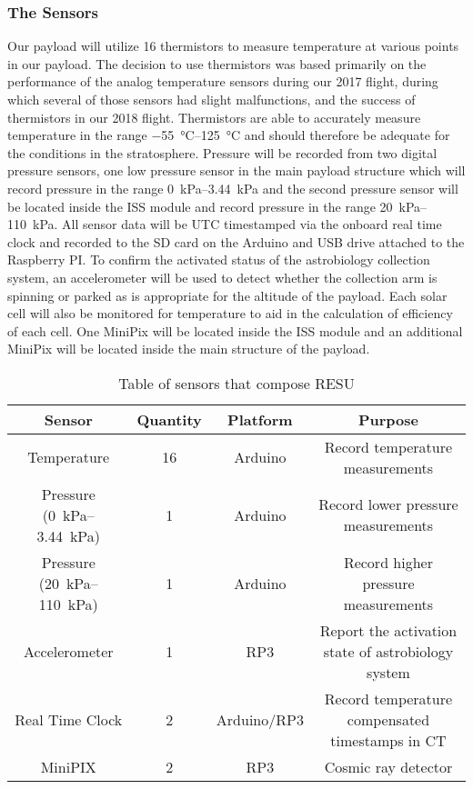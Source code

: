 \subsubsection{The Sensors}

Our payload will utilize 16 thermistors to measure temperature at various points in our payload. The decision to use thermistors was based primarily on the performance of the analog temperature sensors during our 2017 flight, during which several of those sensors had slight malfunctions, and the success of thermistors in our 2018 flight. Thermistors are able to accurately measure temperature in the range \SIrange{-55}{125}{\celsius} and should therefore be adequate for the conditions in the stratosphere. Pressure will be recorded from two digital pressure sensors, one low pressure sensor in the main payload structure which will record pressure in the range \SIrange{0}{3.44}{\kilo\pascal} and the second pressure sensor will be located inside the ISS module and record pressure in the range \SIrange{20}{110}{\kilo\pascal}. All sensor data will be UTC timestamped via the onboard real time clock and recorded to the SD card on the Arduino and USB drive attached to the Raspberry PI. To confirm the activated status of the astrobiology collection system, an accelerometer will be used to detect whether the collection arm is spinning or parked as is appropriate for the altitude of the payload. Each solar cell will also be monitored for temperature to aid in the calculation of efficiency of each cell. One MiniPix will be located inside the ISS module and an additional MiniPix will be located inside the main structure of the payload.

\begin{table}[h!]
\centering
\caption{Table of sensors that compose RESU}
\label{tab:Sensors}
\bigskip
\begin{tabular}{|c|c|c|c|}
\hline
\multicolumn{1}{|c|}{\bfseries Sensor} & {\bfseries Quantity} & {\bfseries Platform} & {\bfseries Purpose} \\
\hline
    Temperature          		& 16 & Arduino  		& Record temperature measurements  \\ \hline
    Pressure (\SIrange{0}{3.44}{\kilo\pascal})        				& 1 & Arduino 		& Record lower pressure measurements \\ \hline
    Pressure (\SIrange{20}{110}{\kilo\pascal})        				& 1 & Arduino 		& Record higher pressure measurements \\ \hline
    Accelerometer       		& 1 & RP3    		& Report the activation state of astrobiology system \\ \hline    
    Real Time Clock 				& 2 & Arduino/RP3 	& Record temperature compensated timestamps in CT \\\hline
    MiniPIX         				& 2 & RP3     		& Cosmic ray detector \\ \hline
\end{tabular}
\end{table}


